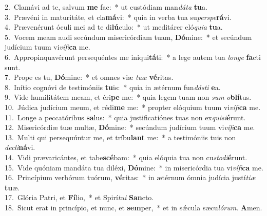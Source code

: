 {2.~}Clamávi ad te, salvum \textbf{me} fac:~* ut custódiam man\textit{dá}\textit{ta} \textbf{tu}a.\\
{3.~}Prævéni in maturitáte, et cla\textbf{má}vi:~* quia in verba tua su\textit{per}\textit{spe}\textbf{rá}vi.\\
{4.~}Prævenérunt óculi mei ad te di\textbf{lú}culo:~* ut meditárer eló\textit{qui}\textit{a} \textbf{tu}a.\\
{5.~}Vocem meam audi secúndum misericórdiam tuam, \textbf{Dó}mine:~* et secúndum judícium tuum vi\textit{ví}\textit{fi}\textbf{ca} me.\\
{6.~}Appropinquavérunt persequéntes me iniqui\textbf{tá}ti:~* a lege autem tua \textit{lon}\textit{ge} \textbf{fa}cti sunt.\\
{7.~}Prope es tu, \textbf{Dó}mine:~* et omnes viæ \textit{tu}\textit{æ} \textbf{vé}ritas.\\
{8.~}Inítio cognóvi de testimóniis \textbf{tu}is:~* quia in ætérnum fun\textit{dá}\textit{sti} \textbf{e}a.\\
{9.~}Vide humilitátem meam, et éri\textbf{pe} me:~* quia legem tuam non \textit{sum} \textit{o}\textbf{blí}tus.\\
{10.~}Júdica judícium meum, et rédi\textbf{me} me:~* propter elóquium tuum vi\textit{ví}\textit{fi}\textbf{ca} me.\\
{11.~}Longe a peccatóribus \textbf{sa}lus:~* quia justificatiónes tuas non ex\textit{qui}\textit{si}\textbf{é}runt.\\
{12.~}Misericórdiæ tuæ multæ, \textbf{Dó}mine:~* secúndum judícium tuum vi\textit{ví}\textit{fi}\textbf{ca} me.\\
{13.~}Multi qui persequúntur me, et tríbu\textbf{lant} me:~* a testimóniis tuis non \textit{de}\textit{cli}\textbf{ná}vi.\\
{14.~}Vidi prævaricántes, et tabe\textbf{scé}bam:~* quia elóquia tua non cu\textit{sto}\textit{di}\textbf{é}runt.\\
{15.~}Vide quóniam mandáta tua diléxi, \textbf{Dó}mine:~* in misericórdia tua vi\textit{ví}\textit{fi}\textbf{ca} me.\\
{16.~}Princípium verbórum tuórum, \textbf{vé}ritas:~* in ætérnum ómnia judícia justí\textit{ti}\textit{æ} \textbf{tu}æ.\\
{17.~}Glória Patri, et \textbf{Fí}lio,~* et Spirí\textit{tu}\textit{i} \textbf{San}cto.\\
{18.~}Sicut erat in princípio, et nunc, et \textbf{sem}per,~* et in sǽcula sæcu\textit{ló}\textit{rum}. \textbf{A}men.\\
